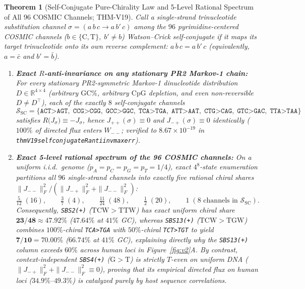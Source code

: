 \documentclass[11pt, a4paper]{article}
\newtheorem{theorem}{Theorem}[section]
\DeclareRobustCommand{\_}{\textunderscore\allowbreak}
\begin{document}
\begin{theorem}[Self-Conjugate Pure-Chirality Law and 5-Level Rational Spectrum of All 96 COSMIC Channels; THM-V19]
\label{thm:v19}
Call a single-strand trinucleotide substitution channel $\sigma = (a\,b\,c \to a\,b'\,c)$ among the $96$ pyrimidine-centered COSMIC channels ($b \in \{\mathrm{C}, \mathrm{T}\},\; b' \neq b$) \emph{Watson--Crick self-conjugate} if it maps its target trinucleotide onto its own reverse complement: $\overline{a\,b\,c} = a\,b'\,c$ (equivalently, $a = \bar{c}$ and $b' = \bar{b}$).
\begin{enumerate}
    \item \textbf{Exact $R$-anti-invariance on any stationary PR2 Markov-1 chain:} For every stationary PR2-symmetric Markov-1 dinucleotide distribution $D \in \mathbb{R}^{4 \times 4}$ (arbitrary $\mathrm{GC}\%$, arbitrary $\mathrm{CpG}$ depletion, and even non-reversible $D \neq D^\top$), each of the exactly $8$ self-conjugate channels
    \begin{equation}
        \mathcal{S}_{\mathrm{SC}} = \{\texttt{ACT>AGT},\; \texttt{CCG>CGG},\; \texttt{GCC>GGC},\; \mathbf{\texttt{TCA>TGA}},\; \texttt{ATT>AAT},\; \texttt{CTG>CAG},\; \texttt{GTC>GAC},\; \texttt{TTA>TAA}\}
    \end{equation}
    satisfies $R\bigl(J_\sigma\bigr) \equiv -J_\sigma$, hence $J_{++}(\sigma) \equiv 0$ and $J_{-+}(\sigma) \equiv 0$ identically ($100\%$ of directed flux enters $W_{--}$; verified to $8.67 \times 10^{-19}$ in \texttt{thmV19\_self\_conjugate\_R\_antiinv\_max\_err}).
    \item \textbf{Exact 5-level rational spectrum of the 96 COSMIC channels:} On a uniform i.i.d.\ genome ($p_A=p_C=p_G=p_T=1/4$), exact $4^8$-state enumeration partitions all $96$ single-strand channels into exactly five rational chiral shares $\|J_{--}\|_F^2 / (\|J_{-+}\|_F^2 + \|J_{--}\|_F^2)$:
    \begin{equation}
        \tfrac{5}{12}\;(16),\qquad \tfrac{3}{7}\;(4),\qquad \tfrac{11}{24}\;(48),\qquad \tfrac{1}{2}\;(20),\qquad 1\;(8 \text{ channels in } \mathcal{S}_{\mathrm{SC}}).
    \end{equation}
    Consequently, \texttt{SBS2(+)} ($\mathrm{TCW>TTW}$) has exact uniform chiral share $\mathbf{23/48} \approx 47.92\%$ ($47.64\%$ at $41\%$ GC), whereas \texttt{SBS13(+)} ($\mathrm{TCW>TGW}$) combines $100\%$-chiral \texttt{TCA>TGA} with $50\%$-chiral \texttt{TCT>TGT} to yield $\mathbf{7/10} = 70.00\%$ ($66.74\%$ at $41\%$ GC), explaining directly why the \texttt{SBS13(+)} column exceeds $60\%$ across human loci in Figure~\ref{fig:v2}A. By contrast, context-independent \texttt{SBS4(+)} ($\mathrm{G>T}$) is strictly $T$-even on uniform DNA ($\|J_{-+}\|_F^2 + \|J_{--}\|_F^2 \equiv 0$), proving that its empirical directed flux on human loci ($34.9\%\text{--}49.3\%$) is catalyzed purely by host sequence correlations.
\end{enumerate}
\end{theorem}
\end{document}
